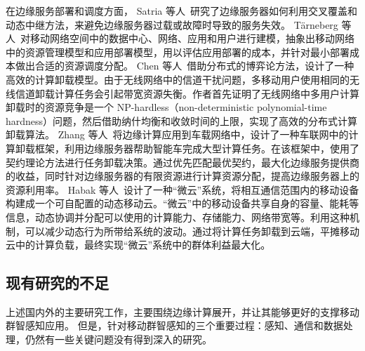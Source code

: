 在边缘服务部署和调度方面，
Satria 等人~\cite{DBLP:journals/fgcs/SatriaPJ17}研究了边缘服务器如何利用交叉覆盖和动态中继方法，来避免边缘服务器过载或故障时导致的服务失效。
T{\"{a}}rneberg 等人~\cite{DBLP:journals/fgcs/TarnebergMWTEKE17}对移动网络空间中的数据中心、网络、应用和用户进行建模，抽象出移动网络中的资源管理模型和应用部署模型，用以评估应用部署的成本，并针对最小部署成本做出合适的资源调度分配。
Chen 等人~\cite{DBLP:journals/ton/ChenJLF16}借助分布式的博弈论方法，设计了一种高效的计算卸载模型。由于无线网络中的信道干扰问题，多移动用户使用相同的无线信道卸载计算任务会引起带宽资源失衡。作者首先证明了无线网络中多用户计算卸载时的资源竞争是一个 NP-hardless（non-deterministic polynomial-time hardness）问题，然后借助纳什均衡和收敛时间的上限，实现了高效的分布式计算卸载算法。
Zhang 等人~\cite{DBLP:conf/rndm/ZhangMLV016}将边缘计算应用到车载网络中，设计了一种车联网中的计算卸载框架，利用边缘服务器帮助智能车完成大型计算任务。在该框架中，使用了契约理论方法进行任务卸载决策。通过优先匹配最优契约，最大化边缘服务提供商的收益，同时针对边缘服务器的有限资源进行计算资源分配，提高边缘服务器上的资源利用率。
Habak 等人~\cite{DBLP:conf/IEEEcloud/HabakAHZ15}设计了一种“微云”系统，将相互通信范围内的移动设备构建成一个可自配置的动态移动云。“微云”中的移动设备共享自身的容量、能耗等信息，动态协调并分配可以使用的计算能力、存储能力、网络带宽等。利用这种机制，可以减少动态行为所带给系统的波动。通过将计算任务卸载到云端，平摊移动云中的计算负载，最终实现“微云”系统中的群体利益最大化。




\subsection{现有研究的不足}


上述国内外的主要研究工作，主要围绕边缘计算展开，并让其能够更好的支撑移动群智感知应用。
但是，针对移动群智感知的三个重要过程：感知、通信和数据处理，仍然有一些关键问题没有得到深入的研究。

